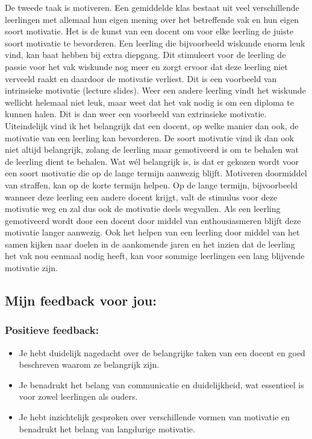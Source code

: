 \documentclass{article}
\begin{document}
{                De tweede taak is motiveren. Een gemiddelde klas bestaat uit veel verschillende leerlingen met allemaal hun eigen mening over het betreffende vak en hun eigen soort motivatie. Het is de kunst van een docent om voor elke leerling de juiste soort motivatie te bevorderen. Een leerling die bijvoorbeeld wiskunde enorm leuk vind, kan baat hebben bij extra diepgang. Dit stimuleert voor de leerling de passie voor het vak wiskunde nog meer en zorgt ervoor dat deze leerling niet verveeld raakt en daardoor de motivatie verliest. Dit is een voorbeeld van intrinsieke motivatie (lecture slides).
                Weer een andere leerling vindt het wiskunde wellicht helemaal niet leuk, maar weet dat het vak nodig is om een diploma te kunnen halen. Dit is dan weer een voorbeeld van extrinsieke motivatie. 
                Uiteindelijk vind ik het belangrijk dat een docent, op welke manier dan ook, de motivatie van een leerling kan bevorderen. De soort motivatie vind ik dan ook niet altijd belangrijk, zolang de leerling maar gemotiveerd is om te behalen wat de leerling dient te behalen. Wat wél belangrijk is, is dat er gekozen wordt voor een soort motivatie die op de lange termijn aanwezig blijft. Motiveren doormiddel van straffen, kan op de korte termijn helpen. Op de lange termijn, bijvoorbeeld wanneer deze leerling een andere docent krijgt, valt de stimulus voor deze motivatie weg en zal dus ook de motivatie deels wegvallen. Als een leerling gemotiveerd wordt door een docent door middel van enthousiasmeren blijft deze motivatie langer aanwezig. Ook het helpen van een leerling door middel van het samen kijken naar doelen in de aankomende jaren en het inzien dat de leerling het vak nou eenmaal nodig heeft, kan voor sommige leerlingen een lang blijvende motivatie zijn.}

        \bigskip

        \subsection{Mijn feedback voor jou:}

            \subsubsection{Positieve feedback:}

                \begin{itemize}
                    \item Je hebt duidelijk nagedacht over de belangrijke taken van een docent en goed beschreven waarom ze belangrijk zijn.
                    \item Je benadrukt het belang van communicatie en duidelijkheid, wat essentieel is voor zowel leerlingen als ouders.
                    \item Je hebt inzichtelijk gesproken over verschillende vormen van motivatie en benadrukt het belang van langdurige motivatie.
                \end{itemize}
                \bigskip
\end{document}
